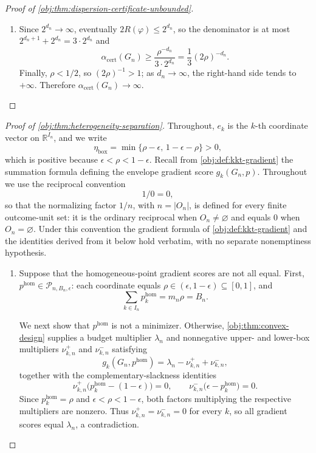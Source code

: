 \documentclass[11pt]{article}
\begin{document}
\begin{proof}[Proof of \cref{obj:thm:dispersion-certificate-unbounded}]
\begin{enumerate}
\item Since \(2^{d_n}\to\infty\), eventually
\(2R(\varphi)\leq2^{d_n}\), so the denominator is at most \(2^{d_n+1}+2^{d_n}=3\cdot2^{d_n}\) and
\[
\alpha_{\mathrm{cert}}(G_n)\geq
\frac{\rho^{-d_n}}{3\cdot2^{d_n}}
=\frac13(2\rho)^{-d_n}.
\]
Finally, \(\rho<1/2\), so \((2\rho)^{-1}>1\); as \(d_n\to\infty\), the
right-hand side tends to \(+\infty\).  Therefore
\(\alpha_{\mathrm{cert}}(G_n)\to\infty\).
\end{enumerate}
\end{proof}

\begin{proof}[Proof of \cref{obj:thm:heterogeneity-separation}]
Throughout, \(e_k\) is the \(k\)-th coordinate vector on \(\mathbb R^{I_n}\), and we write
\[
\eta_{\mathrm{box}}=\min\{\rho-\epsilon,\,1-\epsilon-\rho\}>0,
\]
which is positive because \(\epsilon<\rho<1-\epsilon\).  Recall from \cref{obj:def:kkt-gradient} the summation formula defining the envelope gradient score \(g_k(G_n,p)\).  Throughout we use the reciprocal convention
\[
1/0=0,
\]
so that the normalizing factor \(1/n\), with \(n=\lvert O_n\rvert\), is defined for every finite outcome-unit set: it is the ordinary reciprocal when \(O_n\neq\varnothing\) and equals \(0\) when \(O_n=\varnothing\).  Under this convention the gradient formula of \cref{obj:def:kkt-gradient} and the identities derived from it below hold verbatim, with no separate nonemptiness hypothesis.

\begin{enumerate}
\item Suppose that the homogeneous-point gradient scores are not all equal.  First, \(p^{\mathrm{hom}}\in\mathcal P_{n,B_n,\epsilon}\): each coordinate equals \(\rho\in(\epsilon,1-\epsilon)\subseteq[0,1]\), and
\[
\sum_{k\in I_n}p^{\mathrm{hom}}_k=m_n\rho=B_n.
\]

We next show that \(p^{\mathrm{hom}}\) is not a minimizer.  Otherwise, \cref{obj:thm:convex-design} supplies a budget multiplier \(\lambda_n\) and nonnegative upper- and lower-box multipliers \(\nu^+_{k,n}\) and \(\nu^-_{k,n}\) satisfying
\[
g_k(G_n,p^{\mathrm{hom}})
=\lambda_n-\nu^+_{k,n}+\nu^-_{k,n},
\]
together with the complementary-slackness identities
\[
\nu^+_{k,n}\bigl(p^{\mathrm{hom}}_k-(1-\epsilon)\bigr)=0,
\qquad
\nu^-_{k,n}\bigl(\epsilon-p^{\mathrm{hom}}_k\bigr)=0.
\]
Since \(p^{\mathrm{hom}}_k=\rho\) and \(\epsilon<\rho<1-\epsilon\), both factors multiplying the respective multipliers are nonzero.  Thus \(\nu^+_{k,n}=\nu^-_{k,n}=0\) for every \(k\), so all gradient scores equal \(\lambda_n\), a contradiction.


\end{enumerate}
\end{proof}
\end{document}
